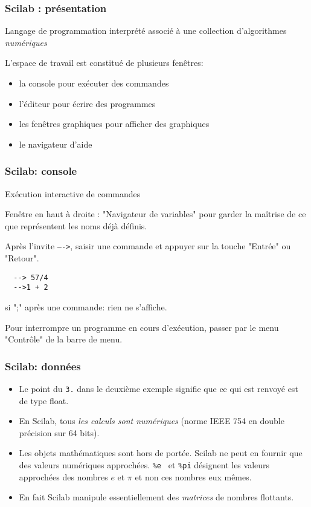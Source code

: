 
\lstset{language=Scilab,frame=single}

\begin{frame}
  \frametitle{Scilab : présentation}
Langage de programmation interprété associé à une collection d'algorithmes \emph{numériques}

L'espace de travail est constitué de plusieurs fenêtres:
\begin{itemize}
  \item la console pour exécuter des commandes
  \item l'éditeur pour écrire des programmes
  \item les fenêtres graphiques pour afficher des graphiques
  \item le navigateur d'aide
\end{itemize}
\end{frame}

\begin{frame}[fragile]
  \frametitle{Scilab: console}
Exécution interactive de commandes 

Fenêtre en haut à droite : "Navigateur de variables" pour garder la maîtrise de ce que représentent les noms déjà définis.

Après l'invite \texttt{---->}, saisir une commande et appuyer sur la touche "Entrée" ou "Retour".
\begin{verbatim}
  --> 57/4
  -->1 + 2
\end{verbatim}
si ";" après une commande: rien ne s'affiche.

Pour interrompre un programme en cours d'exécution, passer par le menu "Contrôle" de la barre de menu.
\end{frame}

\begin{frame}
  \frametitle{Scilab: données}
\begin{itemize}
  \item Le point du \texttt{3.} dans le deuxième exemple signifie que ce qui est renvoyé est de type float.
  \item En Scilab, tous \emph{les calculs sont numériques} (norme IEEE 754 en double précision sur 64 bits).
  \item Les objets mathématiques sont hors de portée. Scilab ne peut en fournir que des valeurs numériques approchées.\newline
 \texttt{\%e } et \texttt{\%pi} désignent les valeurs approchées des nombres $e$ et $\pi$ et non ces nombres eux mêmes.
  \item En fait Scilab manipule essentiellement des \emph{matrices} de nombres flottants.
\end{itemize}
\end{frame}

